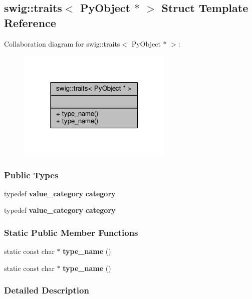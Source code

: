 \subsection{swig\+:\+:traits$<$ Py\+Object $\ast$ $>$ Struct Template Reference}
\label{structswig_1_1traits_3_01PyObject_01_5_01_4}


Collaboration diagram for swig\+:\+:traits$<$ Py\+Object $\ast$ $>$\+:
\nopagebreak
\begin{figure}[H]
\begin{center}
\leavevmode
\includegraphics[width=210pt]{de/d2e/structswig_1_1traits_3_01PyObject_01_5_01_4__coll__graph}
\end{center}
\end{figure}
\subsubsection*{Public Types}
\begin{DoxyCompactItemize}
\item 
typedef {\bf value\+\_\+category} {\bf category}
\item 
typedef {\bf value\+\_\+category} {\bf category}
\end{DoxyCompactItemize}
\subsubsection*{Static Public Member Functions}
\begin{DoxyCompactItemize}
\item 
static const char $\ast$ {\bf type\+\_\+name} ()
\item 
static const char $\ast$ {\bf type\+\_\+name} ()
\end{DoxyCompactItemize}


\subsubsection{Detailed Description}
